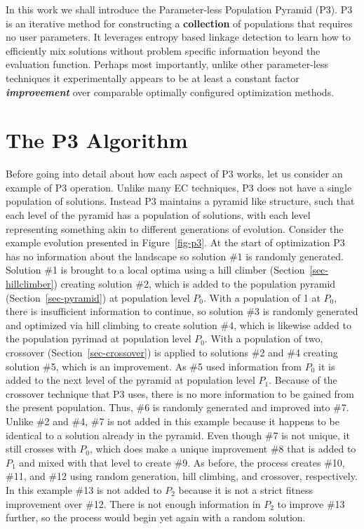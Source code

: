 \documentclass{sig-alternate}
\begin{document}
In this work we shall introduce the Parameter-less Population Pyramid
(P3).  P3 is an iterative method for constructing a \textbf{collection} of
populations that requires no user parameters.  It leverages entropy based
linkage detection to learn how to efficiently mix solutions without
problem specific information beyond the evaluation function.  Perhaps
most importantly, unlike other parameter-less techniques it
experimentally appears to be at least a constant factor
\emph{\textbf{improvement}} over comparable optimally configured
optimization methods.

\section{The P3 Algorithm}
\label{sec-p3}
Before going into detail about how each aspect of P3 works, let us
consider an example of P3 operation. Unlike many EC techniques, P3
does not have a single population of solutions.  Instead P3 maintains
a pyramid like structure, such that each level of the pyramid has a
population of solutions, with each level representing something akin
to different generations of evolution. Consider the example evolution
presented in Figure~\ref{fig-p3}.  At the start of optimization P3
has no information about the landscape so solution \#1 is randomly generated.  Solution \#1
is brought to a local optima using a hill climber
(Section~\ref{sec-hillclimber}) creating solution \#2, which is added
to the population pyramid (Section~\ref{sec-pyramid}) at population
level $P_0$.  With a population of 1 at $P_0$, there is insufficient information to continue,
so solution \#3 is randomly generated and optimized via hill climbing
to create solution \#4, which is likewise added to the population
pyrimad at population level $P_0$.  With a population of two,
crossover (Section~\ref{sec-crossover}) is applied to solutions \#2
and \#4 creating solution \#5, which is an improvement. As \#5 used
information from $P_0$ it is added to the next level of the pyramid at
population level $P_1$.  Because of the crossover technique that P3
uses, there is no more information to be gained from the present
population. Thus, \#6 is randomly
generated and improved into \#7.  Unlike \#2 and \#4, \#7 is not added
in this example because it happens to be identical to a solution
already in the pyramid.  Even though \#7 is not unique, it still
crosses with $P_0$, which does make a unique improvement \#8 that is
added to $P_1$ and mixed with that level to create \#9.  As before,
the process creates \#10, \#11, and \#12 using random generation, hill
climbing, and crossover, respectively.  In this example \#13 is not
added to $P_2$ because it is not a strict fitness improvement over
\#12.  There is not enough information in $P_2$ to improve \#13
further, so the process would begin yet again with a random solution.
\end{document}
